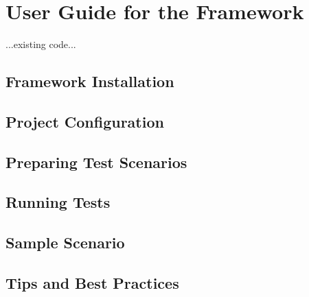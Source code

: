 
\chapter{User Guide for the Framework\label{chap:user_guide}}

...existing code...

\section{Framework Installation}


\section{Project Configuration}


\section{Preparing Test Scenarios}


\section{Running Tests}


\section{Sample Scenario}


\section{Tips and Best Practices}

